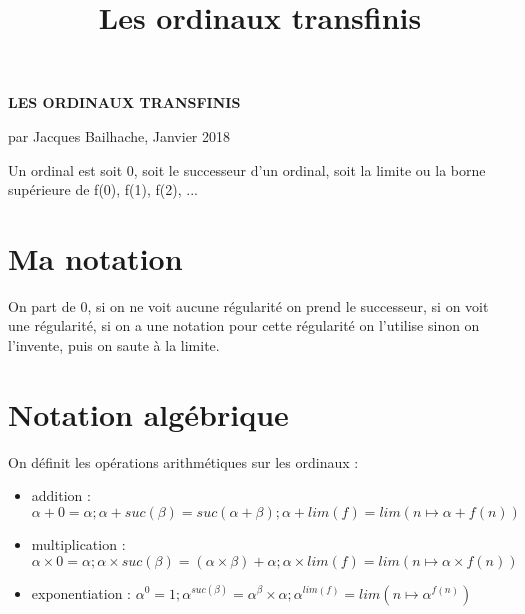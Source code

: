 \documentclass[8pt]{article}
\title{Les ordinaux transfinis}
\begin{document}
\setlength{\parindent}{0pt}

\vspace{-0.4cm}

\begin{center}
\textbf{LES ORDINAUX TRANSFINIS}

par Jacques Bailhache, Janvier 2018
\end{center}

\vspace{-0.2cm}

Un ordinal est soit 0, soit le successeur d'un ordinal, soit la limite ou la borne supérieure de f(0), f(1), f(2), ...
\vspace{-0.7cm}

\section{Ma notation}
\vspace{-0.4cm}
On part de 0, si on ne voit aucune régularité on prend le successeur, si on voit une régularité, si on a une notation pour cette régularité on l'utilise sinon on l'invente, puis on saute à la limite.
\vspace{-0.6cm}

\section{Notation algébrique}
\vspace{-0.4cm}
On définit les opérations arithmétiques sur les ordinaux :
\vspace{-0.4cm}
\smallskip
\begin{itemize}
     \setlength{\itemsep}{1pt}
     \setlength{\parskip}{0pt}
     \setlength{\parsep}{0pt}
\item addition : \( \alpha+0=\alpha ; \alpha+suc(\beta)=suc(\alpha+\beta); \alpha+lim(f)=lim(n \mapsto \alpha+f(n)) \)
\vspace{-0.1cm}
\item multiplication : \( \alpha \times 0 = \alpha ; \alpha \times suc(\beta) = (\alpha \times \beta) + \alpha ; \alpha \times lim(f) = lim (n \mapsto \alpha \times f(n)) \)
\vspace{-0.1cm}
\item exponentiation : \( \alpha^0 = 1 ; \alpha^{suc(\beta)} = \alpha^\beta \times \alpha ; \alpha^{lim(f)} = lim (n \mapsto \alpha^{f(n)}) \)
\end{itemize}
\vspace{-0.8cm}
\end{document}
